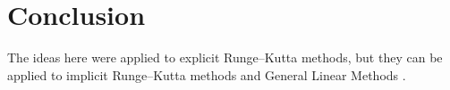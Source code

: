 \section{Conclusion}\label{sec:Conclusion}

\qquad The ideas here were applied to explicit Runge--Kutta methods, but they
can be applied to implicit Runge--Kutta methods and General Linear
Methods \cite{Butcher2008_book}.


%
%
%
%
